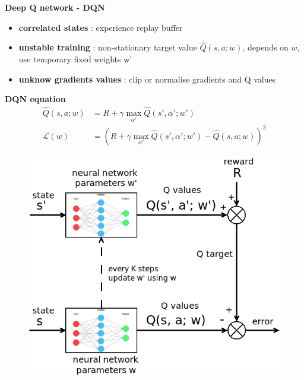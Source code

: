 \documentclass[xcolor=dvipsnames]{beamer}
\begin{document}
\begin{frame}{\bf Deep Q network - DQN}

\begin{itemize}
\item {\bf \color{red} correlated states} : experience replay buffer \\
\item {\bf \color{red} unstable training} : non-stationary target value $\hat{Q}(s, a; w)$, depends on $w$, use temporary fixed weights w' \\
\item {\bf \color{red} unknow gradients values} : clip or normalise gradients and Q values
\end{itemize}
{\bf DQN equation}
\begin{align*}
  \hat{Q}(s, a; w) &= R + \gamma \max \limits_{\alpha'} \hat{Q}(s', \alpha'; w') \\
  \mathcal{L}(w) &= (R + \gamma \max \limits_{\alpha'} \hat{Q}(s', \alpha'; w') - \hat{Q}(s, a; w))^2
  \label{eq:dqn}
\end{align*}



\begin{figure}[!htb]
  \centering
  \includegraphics[scale=0.16]{./diagrams/dqn.png}
  \label{img:dqn}
\end{figure}


\end{frame}
\end{document}
